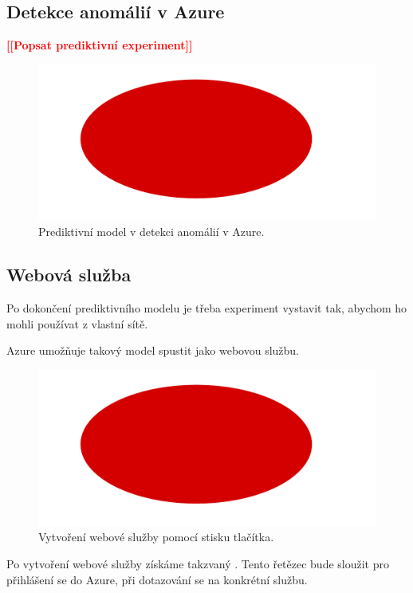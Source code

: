 \documentclass[thesis=M,czech]{FITthesis}[2012/10/20]
\newcommand{\todo}[1]{\textcolor{red}{\textbf{[[#1]]}}}
\newcommand{\blind}[1][1]{\textcolor{gray}{\Blindtext[#1][1]}}
\begin{document}
		\subsection{Detekce anomálií v Azure}
			\todo{Popsat prediktivní experiment}
			\blind[1]
		\begin{figure}[htb]\centering
			\includegraphics[width=\textwidth]{./img/todo}
			\caption{Prediktivní model v detekci anomálií v Azure.}
			\label{fig:training_anomaly_azure}
		\end{figure}
	
		\subsection{Webová služba}
			Po dokončení prediktivního modelu je třeba experiment vystavit tak, abychom ho mohli používat z vlastní sítě.
			
			Azure umožňuje takový model spustit jako webovou službu.
			
			  \begin{figure}[htb]\centering
			  	\includegraphics[width=\textwidth]{./img/todo}
			  	\caption{Vytvoření webové služby pomocí stisku tlačítka.}
			  	\label{fig:azure_create_web_servise}
			  \end{figure}
		  
		  Po vytvoření webové služby získáme takzvaný . Tento řetězec bude sloužit pro přihlášení se do Azure, při dotazování se na konkrétní službu.
		  
\end{document}
